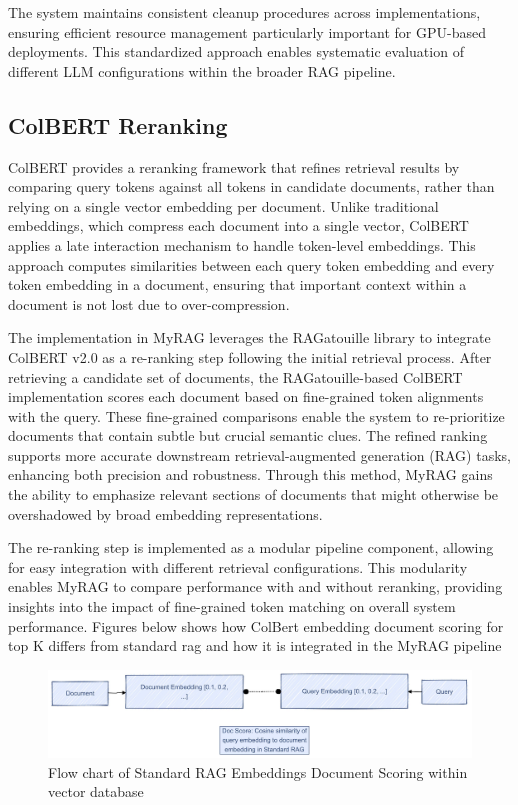 \documentclass{scrartcl}
\begin{document}
The system maintains consistent cleanup procedures across implementations, ensuring efficient resource management particularly important for GPU-based deployments. This standardized approach enables systematic evaluation of different LLM configurations within the broader RAG pipeline.



\subsection{ColBERT Reranking}
ColBERT \cite{khattab2020colbert} provides a reranking framework that refines retrieval results by comparing query tokens against all tokens in candidate documents, rather than relying on a single vector embedding per document. Unlike traditional embeddings, which compress each document into a single vector, ColBERT applies a late interaction mechanism to handle token-level embeddings. This approach computes similarities between each query token embedding and every token embedding in a document, ensuring that important context within a document is not lost due to over-compression.

The implementation in MyRAG leverages the RAGatouille library \cite{ragatouille} to integrate ColBERT v2.0 as a re-ranking step following the initial retrieval process. After retrieving a candidate set of documents, the RAGatouille-based ColBERT implementation scores each document based on fine-grained token alignments with the query. These fine-grained comparisons enable the system to re-prioritize documents that contain subtle but crucial semantic clues. The refined ranking supports more accurate downstream retrieval-augmented generation (RAG) tasks, enhancing both precision and robustness. Through this method, MyRAG gains the ability to emphasize relevant sections of documents that might otherwise be overshadowed by broad embedding representations.

The re-ranking step is implemented as a modular pipeline component, allowing for easy integration with different retrieval configurations. This modularity enables MyRAG to compare performance with and without reranking, providing insights into the impact of fine-grained token matching on overall system performance. Figures below shows how ColBert embedding document scoring for top K differs from standard rag and how it is integrated in the MyRAG pipeline


\begin{figure}[H]
	\centering
	\includegraphics[width=\linewidth]{StandardRAGDocumentScoring.pdf}
	\caption{Flow chart of Standard RAG Embeddings Document Scoring within vector database}
	\label{fig:standard_doc_scoring}
\end{figure}
\end{document}
